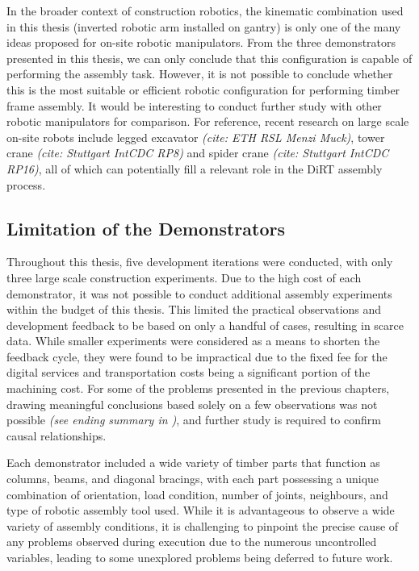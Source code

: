 In the broader context of construction robotics, the kinematic combination used in this thesis (inverted robotic arm installed on gantry) is only one of the many ideas proposed for on-site robotic manipulators. From the three demonstrators presented in this thesis, we can only conclude that this configuration is capable of performing the assembly task. However, it is not possible to conclude whether this is the most suitable or efficient robotic configuration for performing timber frame assembly. It would be interesting to conduct further study with other robotic manipulators for comparison. For reference, recent research on large scale on-site robots include legged excavator \textit{(cite: ETH RSL Menzi Muck)}, tower crane\textit{ (cite: Stuttgart IntCDC RP8)} and spider crane\textit{ (cite: Stuttgart IntCDC RP16)}, all of which can potentially fill a relevant role in the DiRT assembly process.

\subsection{Limitation of the Demonstrators}
\label{subsection:limitation-of-the-demonstrators}

Throughout this thesis, five development iterations were conducted, with only three large scale construction experiments. Due to the high cost of each demonstrator, it was not possible to conduct additional assembly experiments within the budget of this thesis. This limited the practical observations and development feedback to be based on only a handful of cases, resulting in scarce data. While smaller experiments were considered as a means to shorten the feedback cycle, they were found to be impractical due to the fixed fee for the digital services and transportation costs being a significant portion of the machining cost. For some of the problems presented in the previous chapters, drawing meaningful conclusions based solely on a few observations was not possible \textit{(see ending summary in )}, and further study is required to confirm causal relationships. 

Each demonstrator included a wide variety of timber parts that function as columns, beams, and diagonal bracings, with each part possessing a unique combination of orientation, load condition, number of joints, neighbours, and type of robotic assembly tool used. While it is advantageous to observe a wide variety of assembly conditions, it is challenging to pinpoint the precise cause of any problems observed during execution due to the numerous uncontrolled variables, leading to some unexplored problems being deferred to future work.

